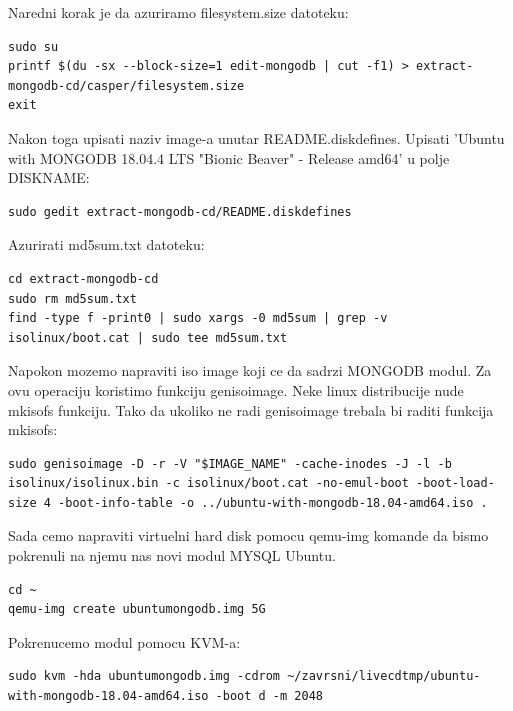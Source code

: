 \documentclass[12pt,vi]{mitthesis}
\begin{document}
\noindent
Naredni korak je da azuriramo filesystem.size datoteku:
\begin{lstlisting}[style=BashInputStyle]
sudo su
printf $(du -sx --block-size=1 edit-mongodb | cut -f1) > extract-mongodb-cd/casper/filesystem.size
exit
\end{lstlisting}

\noindent
Nakon toga upisati naziv image-a unutar README.diskdefines. 
Upisati 'Ubuntu with MONGODB 18.04.4 LTS "Bionic Beaver" - Release amd64' u polje DISKNAME:
\begin{lstlisting}[style=BashInputStyle]
sudo gedit extract-mongodb-cd/README.diskdefines
\end{lstlisting}

\noindent
Azurirati md5sum.txt datoteku:
\begin{lstlisting}[style=BashInputStyle]
cd extract-mongodb-cd
sudo rm md5sum.txt
find -type f -print0 | sudo xargs -0 md5sum | grep -v isolinux/boot.cat | sudo tee md5sum.txt
\end{lstlisting}

\noindent
Napokon mozemo napraviti iso image koji ce da sadrzi MONGODB modul. Za ovu operaciju koristimo funkciju genisoimage. Neke linux distribucije nude mkisofs funkciju. Tako da ukoliko ne radi genisoimage trebala bi raditi funkcija mkisofs:
\begin{lstlisting}[style=BashInputStyle]
sudo genisoimage -D -r -V "$IMAGE_NAME" -cache-inodes -J -l -b isolinux/isolinux.bin -c isolinux/boot.cat -no-emul-boot -boot-load-size 4 -boot-info-table -o ../ubuntu-with-mongodb-18.04-amd64.iso .
\end{lstlisting}

\noindent
Sada cemo napraviti virtuelni hard disk pomocu qemu-img komande da bismo pokrenuli na njemu nas novi modul MYSQL Ubuntu.
\begin{lstlisting}[style=BashInputStyle]
cd ~
qemu-img create ubuntumongodb.img 5G
\end{lstlisting}

\noindent 
Pokrenucemo modul pomocu KVM-a:
\begin{lstlisting}[style=BashInputStyle]
sudo kvm -hda ubuntumongodb.img -cdrom ~/zavrsni/livecdtmp/ubuntu-with-mongodb-18.04-amd64.iso -boot d -m 2048
\end{lstlisting}
\end{document}
